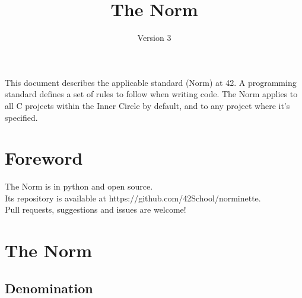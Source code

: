 \documentclass{42-en}
\begin{document}
\title{The Norm}
\subtitle{Version 3}

\summary
{
    This document describes the applicable standard (Norm) at 42. A
    programming standard defines a set of rules to follow when writing code.
    The Norm applies to all C projects within the Inner Circle by default, and
    to any project where it's specified.
}

\maketitle

\tableofcontents



\chapter{Foreword}

    The Norm is in python and open source. \\
    Its repository is available at https://github.com/42School/norminette.\\
    Pull requests, suggestions and issues are welcome!

\chapter{The Norm}


    \section{Denomination}
\end{document}
